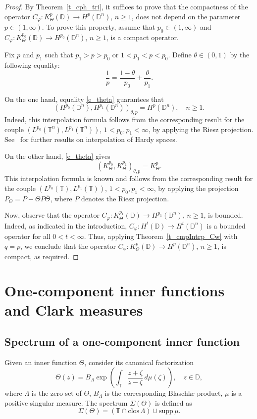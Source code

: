 \documentclass{amsart}
\numberwithin{equation}{section}
\theoremstyle{definition}
\newcommand{\diin}{\Theta}
\newcommand{\za}{\zeta}
\newcommand{\ph}{\varphi}
\newcommand{\cph}{C_\varphi}
\newcommand{\Dbb}{\mathbb D}
\newcommand{\Tbb}{\mathbb T}
\newcommand{\tn}{\mathbb{T}^n}
\newcommand{\dn}{\mathbb{D}^n}
\newcommand{\spr}{\Sigma}
\begin{document}
\begin{proof}
By Theorem~\ref{t_cph_tri}, it suffices to prove that the compactness of the opera\-tor
$\cph: K^p_\diin(\Dbb)\to H^p(\dn)$, $n\ge 1$, does not depend on the parameter $p\in (1, \infty)$.
To prove this property, assume that $p_0\in (1, \infty)$
and $\cph: K^{p_0}_\diin(\Dbb)\to H^{p_0}(\dn)$, $n\ge 1$, is a compact operator.

Fix $p$ and $p_1$ such that $p_1 > p > p_0$ or $1<p_1 < p < p_0$.
Define $\theta\in (0,1)$ by the following equality:
\begin{equation}\label{e_theta}
\frac{1}{p} = \frac{1-\theta}{p_0} + \frac{\theta}{p_1}.
\end{equation}

On the one hand, equality
\eqref{e_theta} guarantees that
\[
(H^{p_0}(\dn), H^{p_1}(\dn))_{\theta, p} = H^{p}(\dn), \quad n\ge 1.
\]
Indeed, this interpolation formula follows from the corresponding result
for the couple $(L^{p_0}(\tn), L^{p_1}(\tn))$, $1< p_0, p_1 < \infty$, by
applying the Riesz projection.
See\ \cite{Ki99} for further results on interpolation of Hardy spaces.

On the other hand, \eqref{e_theta} gives
\[
(K_\diin^{p_0}, K_\diin^{p_1})_{\theta, p} = K_\diin^{p}.
\]
This interpolation formula is known and
follows from the corresponding result
for the couple $(L^{p_0}(\Tbb), L^{p_1}(\Tbb))$, $1< p_0, p_1 < \infty$, by
applying the projection $P_\diin = P- \diin P \overline{\diin}$,
where $P$ denotes the Riesz projection.

Now, observe that the operator $\cph: K^{p_1}_\diin(\Dbb)\to H^{p_1}(\dn)$, $n\ge 1$, is bounded.
Indeed, as indicated in the introduction, $C_\ph: H^t(\Dbb) \to H^t(\dn)$ is a bounded operator for all $0<t<\infty$.
Thus, applying Theorem~\ref{t_cmpIntrp_Cw} with $q=p$, we conclude that the operator
$\cph: K^{p}_\diin(\Dbb)\to H^{p}(\dn)$, $n\ge 1$, is compact, as required.
\end{proof}

\section{One-component inner functions and Clark measures}\label{s_clk}

\subsection{Spectrum of a one-component inner function}
Given an inner function $\diin$, consider its canonical factorization
\[
\diin(z) = B_\Lambda \exp \left( \int_{\Tbb} \frac{z+\za}{z-\za}\, d\mu(\za)\right ), \quad z\in \Dbb,
\]
where $\Lambda$ is the zero set of $\diin$, $B_\Lambda$ is the corresponding Blaschke product,
 $\mu$ is a positive singular measure. The spectrum $\spr (\diin)$ is defined as
 \[
 \spr(\diin) = (\Tbb \cap \mathrm{clos\,} \Lambda) \cup \mathrm{supp\,}\mu.
 \]
\end{document}
